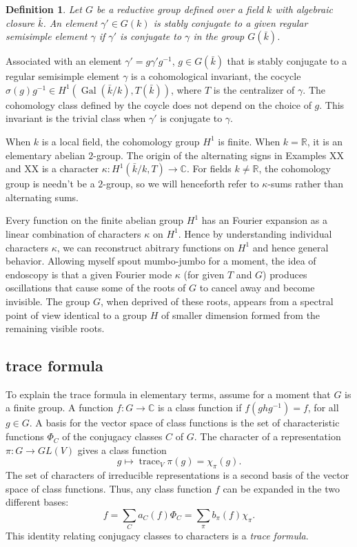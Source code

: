 \documentclass[brochure,english,12pt]{bourbaki}
\newtheorem{definition}[equation]{Definition}
\def\op#1{{\operatorname{#1}}}
\newcommand{\ring}[1]{\mathbb{#1}}
\begin{document}
\begin{definition} Let $G$ be a reductive group defined over a field
  $k$ with algebraic closure $\bar k$.  An element
  $\gamma'\in G(k)$ is {\it stably conjugate} to a given regular
  semisimple element $\gamma$ if $\gamma'$ is conjugate to $\gamma$ in
  the group $G(\bar k)$.
\end{definition}

Associated with an element $\gamma'=g\gamma' g^{-1}$, $g\in G(\bar k)$
that is stably conjugate to a regular semisimple element $\gamma$ is a
cohomological invariant, the cocycle $\sigma(g)g^{-1}\in
H^1(\op{Gal}(\bar k/k),T(\bar k))$, where $T$ is the centralizer of
$\gamma$.  The cohomology class defined by the coycle does not depend
on the choice of $g$.  This invariant is the trivial class when
$\gamma'$ is conjugate to $\gamma$.

When $k$ is a local field, the cohomology group $H^1$ is finite.  When $k=\ring{R}$,
it is an elementary abelian $2$-group.
The origin of the alternating signs in Examples XX and XX is a character
$\kappa:H^1(\bar k/k,T)\to\ring{C}$.  For fields $k\ne\ring{R}$, the cohomology
group is needn't be a $2$-group, so we will henceforth refer to $\kappa$-sums rather
than alternating sums. 

Every function on the finite abelian group $H^1$ has an Fourier
expansion as a linear combination of characters $\kappa$ on $H^1$.
Hence by understanding individual characters $\kappa$, we can
reconstruct abitrary functions on $H^1$ and hence general behavior.
Allowing myself spout mumbo-jumbo for a moment, the idea of endoscopy
is that a given Fourier mode $\kappa$ (for given $T$ and $G$) produces
oscillations that cause some of the roots of $G$ to cancel away and
become invisible.  The group $G$, when deprived of these roots,
appears from a spectral point of view identical to a group $H$ of
smaller dimension formed from the remaining visible roots.


\subsection{trace formula}

To explain the trace formula in elementary terms, assume for a moment that
$G$ is a finite group.  A function  $f:G\to \ring{C}$ is a class function if
$f(g h g^{-1}) = f$, for all $g\in G$.  A basis for the vector space of class functions
is the set of characteristic functions $\Phi_C$ of the conjugacy classes $C$ of $G$. 
The character of a representation $\pi:G\to GL(V)$ gives a class function
\[
g \mapsto \op{trace}_V \pi(g) = \chi_\pi(g).
\]
The set of characters of irreducible representations is a second basis of the vector
space of class functions.  Thus, any class function $f$ can be expanded in the two different bases:
\[
f = \sum_C a_C(f) \Phi_C = \sum_{\pi} b_\pi(f) \chi_\pi.
\]
This identity relating conjugacy classes to characters is a {\it trace formula}.
\end{document}
